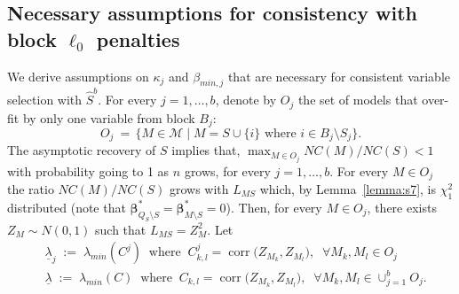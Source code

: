 \documentclass[bj,authoryear]{imsart}
\theoremstyle{plain}
\newcommand{\paul}[1]{{\small{\color{green} \sf $\spadesuit$ Paul: #1}}}
\newcommand{\M}{\mathcal{M}}
\newcommand{\bs}{\boldsymbol}
\begin{document}
\subsection{Necessary assumptions for consistency with block $\ell_0$ penalties}\label{ssec:neccond_linreg}

We derive assumptions on $\kappa_j$ and $\beta_{min,j}$ that are necessary for consistent variable selection with $\hat{S}^b$. %
For every $j=1,\ldots,b$, denote by $O_j$ the set of models that over-fit by only one variable from block $B_j$:
$$O_j \:=\,\{M\in \M\;|\; M=S\cup\{i\} \text{ where } i\in B_j\setminus S_j\}.$$
The asymptotic recovery of $S$ implies that, $\max_{M\in O_j}NC(M)/NC(S)<1$ with probability going to 1 as $n$ grows, for every $j=1,\ldots,b$. For every $M \in O_j$ the ratio $NC(M)/NC(S)$ grows with $L_{MS}$
which, by Lemma~\ref{lemma:s7}, is $\chi^2_1$ distributed (note that $\bs \beta_{Q_S\setminus S}^*=\bs \beta_{M\setminus S}^*=0$). Then, for every $M \in O_j$, there exists $Z_M \sim N(0,1)$ such that $L_{MS}=Z_{M}^2$.
Let
\begin{align}
    &\underline{\lambda}_j\;:=\;\lambda_{min}(C^j)\;\;\text{where} \;\;C^j_{k,l}=\operatorname{corr}\big(Z_{M_k},Z_{M_l}\big),\;\;\forall M_k,M_l \in O_j
    \nonumber \\
    &\underline{\lambda}\;:=\;\lambda_{min}(C)\;\;\text{where} \;\;C_{k,l}=\operatorname{corr}\big(Z_{M_k},Z_{M_l}\big),\;\;\forall M_k,M_l \in \cup_{j=1}^b O_j.
    \nonumber
\end{align}
\end{document}

